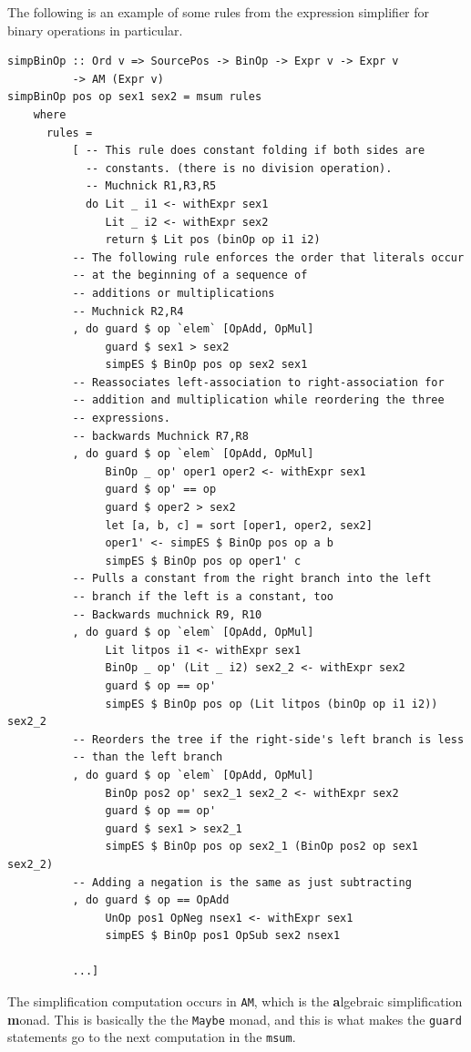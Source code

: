 \documentclass[11pt]{article}
\begin{document}
The following is an example of some rules from the expression
simplifier for binary operations in particular.
{\footnotesize
\begin{verbatim}
simpBinOp :: Ord v => SourcePos -> BinOp -> Expr v -> Expr v
          -> AM (Expr v)
simpBinOp pos op sex1 sex2 = msum rules
    where
      rules =
          [ -- This rule does constant folding if both sides are
            -- constants. (there is no division operation).
            -- Muchnick R1,R3,R5
            do Lit _ i1 <- withExpr sex1
               Lit _ i2 <- withExpr sex2
               return $ Lit pos (binOp op i1 i2)
          -- The following rule enforces the order that literals occur
          -- at the beginning of a sequence of
          -- additions or multiplications
          -- Muchnick R2,R4
          , do guard $ op `elem` [OpAdd, OpMul]
               guard $ sex1 > sex2
               simpES $ BinOp pos op sex2 sex1
          -- Reassociates left-association to right-association for
          -- addition and multiplication while reordering the three
          -- expressions.
          -- backwards Muchnick R7,R8
          , do guard $ op `elem` [OpAdd, OpMul]
               BinOp _ op' oper1 oper2 <- withExpr sex1
               guard $ op' == op
               guard $ oper2 > sex2
               let [a, b, c] = sort [oper1, oper2, sex2]
               oper1' <- simpES $ BinOp pos op a b
               simpES $ BinOp pos op oper1' c
          -- Pulls a constant from the right branch into the left
          -- branch if the left is a constant, too
          -- Backwards muchnick R9, R10
          , do guard $ op `elem` [OpAdd, OpMul]
               Lit litpos i1 <- withExpr sex1
               BinOp _ op' (Lit _ i2) sex2_2 <- withExpr sex2
               guard $ op == op'
               simpES $ BinOp pos op (Lit litpos (binOp op i1 i2)) sex2_2
          -- Reorders the tree if the right-side's left branch is less
          -- than the left branch
          , do guard $ op `elem` [OpAdd, OpMul]
               BinOp pos2 op' sex2_1 sex2_2 <- withExpr sex2
               guard $ op == op'
               guard $ sex1 > sex2_1
               simpES $ BinOp pos op sex2_1 (BinOp pos2 op sex1 sex2_2)
          -- Adding a negation is the same as just subtracting
          , do guard $ op == OpAdd
               UnOp pos1 OpNeg nsex1 <- withExpr sex1
               simpES $ BinOp pos1 OpSub sex2 nsex1

          ...]
\end{verbatim}}

The simplification computation occurs in \texttt{AM}, which is the
\textbf{a}lgebraic simplification \textbf{m}onad.  This is basically
the the \texttt{Maybe} monad, and this is what makes the
\texttt{guard} statements go to the next computation in the
\texttt{msum}.
\end{document}
